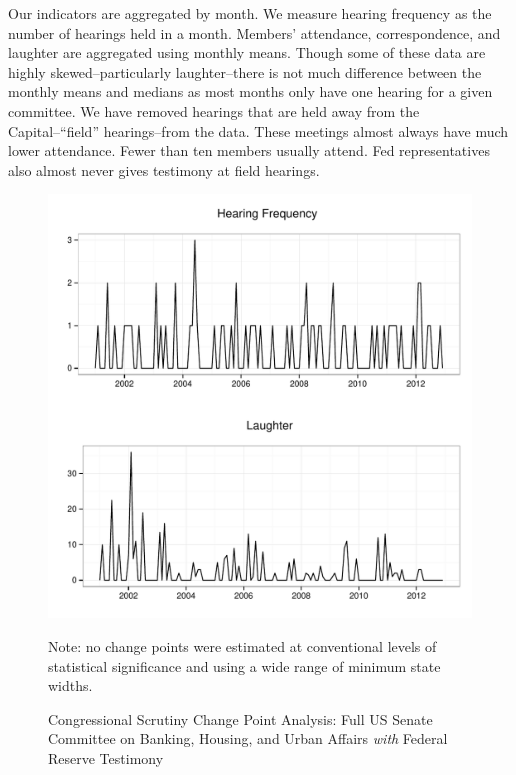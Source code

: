 \documentclass[a4paper]{article}\usepackage[]{graphicx}\usepackage[]{color}
\newenvironment{knitrout}{}{} %
\begin{document}
Our indicators are aggregated by month. We measure hearing frequency as the number of hearings held in a month. Members' attendance, correspondence, and laughter are aggregated using monthly means. Though some of these data are highly skewed--particularly laughter--there is not much difference between the monthly means and medians as most months only have one hearing for a given committee. We have removed hearings that are held away from the Capital--``field'' hearings--from the data. These meetings almost always have much lower attendance. Fewer than ten members usually attend. Fed representatives also almost never gives testimony at field hearings.

\begin{figure}
    \caption{Congressional Scrutiny Change Point Analysis: Full US Senate Committee on Banking, Housing, and Urban Affairs \emph{with} Federal Reserve Testimony}
    \label{fig:SenateFedCP}
\begin{knitrout}
\color{fgcolor}

{\centering \includegraphics[width=0.8\linewidth]{figure/ScrutinySenate} 

}



\end{knitrout}
{\scriptsize{Note: no change points were estimated at conventional levels of statistical significance and using a wide range of minimum state widths.}}
\end{figure}
\end{document}
